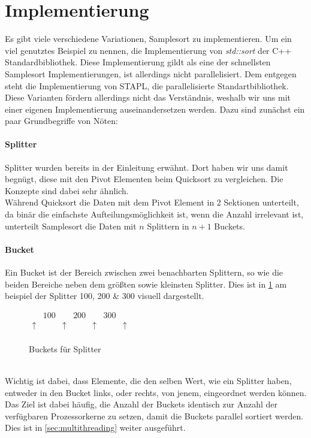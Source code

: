 \section{Implementierung}
	\label{sec:implementation}
	Es gibt viele verschiedene Variationen, Samplesort zu implementieren.
	Um ein viel genutztes Beispiel zu nennen, die Implementierung von \textit{std::sort} der C++ Standardbibliothek. \autocite{unknown-author-2019}
	Diese Implementierung gildt als eine der schnellsten Samplesort Implementierungen, ist allerdings nicht parallelisiert.
	Dem entgegen steht die Implementierung von STAPL, die parallelisierte Standartbibliothek. \autocite{berlin-2007}\\
	Diese Varianten fördern allerdings nicht das Verständnis, weshalb wir uns mit einer eigenen Implementierung auseinandersetzen werden.
	Dazu sind zunächst ein paar Grundbegriffe von Nöten:
	\paragraph{Splitter}
		Splitter wurden bereits in der Einleitung erwähnt.
		Dort haben wir uns damit begnügt, diese mit den Pivot Elementen beim Quicksort zu vergleichen.
		Die Konzepte sind dabei sehr ähnlich.\\
		Während Quicksort die Daten mit dem Pivot Element in 2 Sektionen unterteilt, da binär die einfachste Aufteilungsmöglichkeit ist, wenn die Anzahl irrelevant ist, unterteilt Samplesort die Daten mit $n$ Splittern in $n+1$ Buckets.
	\paragraph{Bucket}
		Ein Bucket ist der Bereich zwischen zwei benachbarten Splittern, so wie die beiden Bereiche neben dem größten sowie kleinsten Splitter.
		Dies ist in \ref{fig:buckets-from-splitters} am beispiel der Splitter 100, 200 \& 300 visuell dargestellt.
		\begin{figure}[h]
			\caption{Buckets für Splitter \autocite{benson-2022}}
			\label{fig:buckets-from-splitters}
			\begin{center}
				\begin{math}
					\begin{matrix}
								 & 100 &          & 200 &          & 300 &          \\
						\uparrow &     & \uparrow &     & \uparrow &     & \uparrow \\
					\end{matrix}
				\end{math}
			\end{center}
		\end{figure}\\
		Wichtig ist dabei, dass Elemente, die den selben Wert, wie ein Splitter haben, entweder in den Bucket links, oder rechts, von jenem, eingeordnet werden können.\\
		Das Ziel ist dabei häufig, die Anzahl der Buckets identisch zur Anzahl der verfügbaren Prozessorkerne zu setzen, damit die Buckets parallel sortiert werden.
		Dies ist in \ref{sec:multithreading} weiter ausgeführt.


